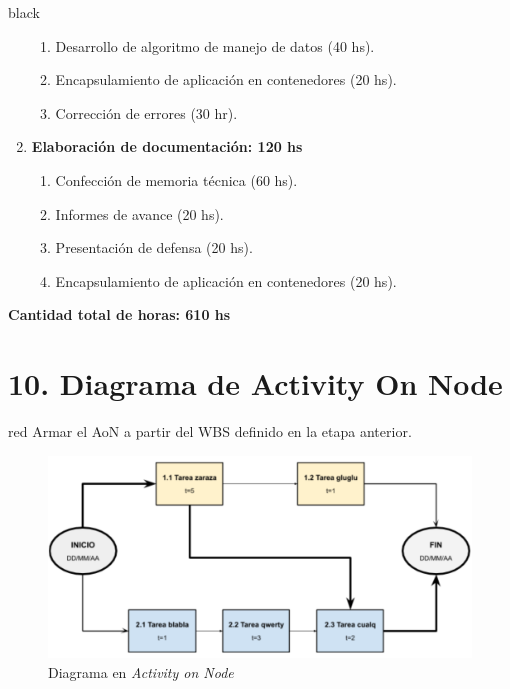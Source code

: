\documentclass[
11pt, %
codirector, %
]{charter}
\begin{document}
\begin{consigna}{black}
\begin{enumerate}
\begin{enumerate}
	\item Desarrollo de algoritmo de manejo de datos (40 hs).
	\item Encapsulamiento de aplicación en contenedores (20 hs).
	\item Corrección de errores (30 hr).
	\end{enumerate}
\item \textbf{Elaboración de documentación: 120 hs}
	\begin{enumerate}
	\item Confección de memoria técnica (60 hs).
	\item Informes de avance (20 hs).
	\item Presentación de defensa (20 hs).
	\item Encapsulamiento de aplicación en contenedores (20 hs).
	\end{enumerate}
\end{enumerate}

\textbf{Cantidad total de horas: 610 hs}

\end{consigna}

\section{10. Diagrama de Activity On Node}
\label{sec:AoN}

\begin{consigna}{red}
Armar el AoN a partir del WBS definido en la etapa anterior. 



\end{consigna}

\begin{figure}[htpb]
\centering 
\includegraphics[width=.8\textwidth]{./Figuras/AoN.png}
\caption{Diagrama en \textit{Activity on Node}}
\label{fig:AoN}
\end{figure}
\end{document}
